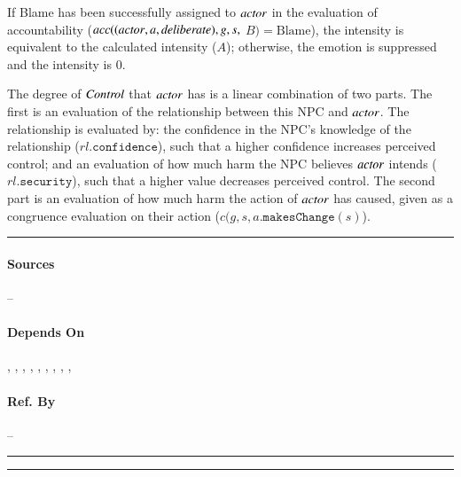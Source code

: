 If Blame has been successfully assigned to $\mathit{actor}$ in the evaluation of
accountability ($acc((\mathit{actor}, a,\allowbreak \mathit{deliberate}), g, s,$ $B) = 
\text{Blame}$), the intensity is equivalent to the calculated intensity ($A$); 
otherwise, the emotion is suppressed and the intensity is $0$.

The degree of $\mathit{Control}$ that $\mathit{actor}$ has is a linear combination of two
parts. The first is an evaluation of the relationship between this NPC and
$\mathit{actor}$. The relationship is evaluated by: the confidence in the NPC's
knowledge of the relationship ($rl.\mathtt{confidence}$), such that a higher
confidence increases perceived control; and an evaluation of how much harm the
NPC believes $\mathit{actor}$ intends ($rl.\mathtt{security}$), such that a higher
value decreases perceived control. The second part is an evaluation of how much
harm the action of $\mathit{actor}$ has caused, given as a congruence evaluation on
their action ($c(g, s, a.\mathtt{makesChange}(s)$). \\\hrule

\paragraph{Sources} --

\paragraph{Depends On} , , 
, , , 
, , , 
, 

\paragraph{Ref. By} -- \\\hrule\vspace{0.5mm}\hrule

~\newline

